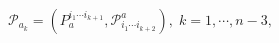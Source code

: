 \begin{equation}
\mathcal{P}_{a_{k}}=\left( P_{a}^{i_{1}\cdots i_{k+1}},\mathcal{P}%
_{i_{1}\cdots i_{k+2}}^{a}\right) ,\;k=1,\cdots ,n-3,  \label{f21}
\end{equation}

